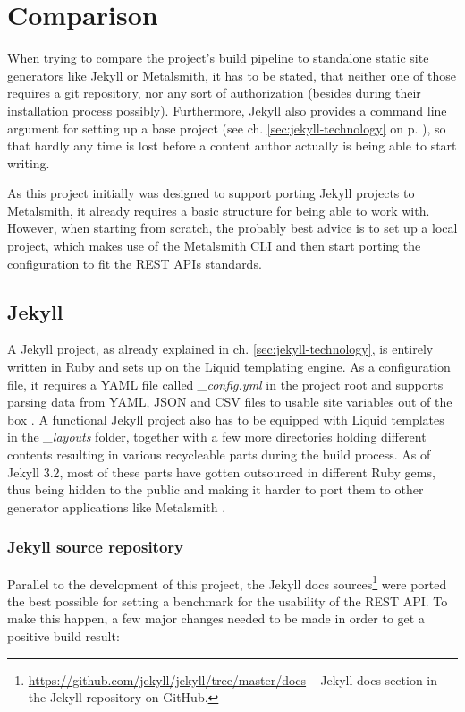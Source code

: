 \section{Comparison}
\label{sec:comparison}

When trying to compare the project's build pipeline to standalone static site generators like Jekyll or Metalsmith, it has to be stated, that neither one of those requires a git repository, nor any sort of authorization (besides during their installation process possibly). Furthermore, Jekyll also provides a command line argument for setting up a base project (see ch. \ref{sec:jekyll-technology} on p. \pageref{sec:jekyll-technology}), so that hardly any time is lost before a content author actually is being able to start writing.

As this project initially was designed to support porting Jekyll projects to Metalsmith, it already requires a basic structure for being able to work with. However, when starting from scratch, the probably best advice is to set up a local project, which makes use of the Metalsmith CLI and then start porting the configuration to fit the REST APIs standards.

\subsection{Jekyll}
A Jekyll project, as already explained in ch. \ref{sec:jekyll-technology}, is entirely written in Ruby and sets up on the Liquid templating engine. As a configuration file, it requires a YAML file called \emph{\_config.yml} in the project root and supports parsing data from YAML, JSON and CSV files to usable site variables out of the box \cite[76]{dhillon2016}. A functional Jekyll project also has to be equipped with Liquid templates in the \emph{\_layouts} folder, together with a few more directories holding different contents resulting in various recycleable parts during the build process. As of Jekyll 3.2, most of these parts have gotten outsourced in different Ruby gems, thus being hidden to the public and making it harder to port them to other generator applications like Metalsmith \cite{JekyllDirectoryStructure}.

\subsubsection{Jekyll source repository}
Parallel to the development of this project, the Jekyll docs sources\footnote{\url{https://github.com/jekyll/jekyll/tree/master/docs} -- Jekyll docs section in the Jekyll repository on GitHub.} were ported the best possible for setting a benchmark for the usability of the REST API. To make this happen, a few major changes needed to be made in order to get a positive build result:

